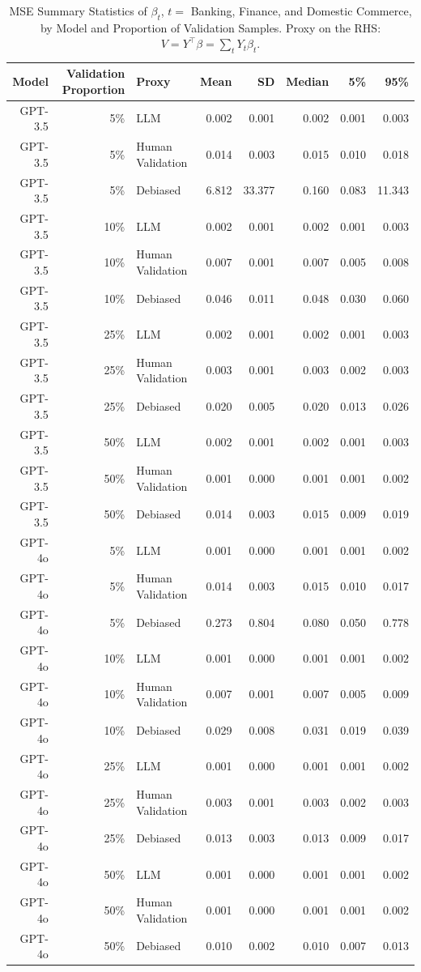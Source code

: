 \begin{table}

\caption{\label{tab:unnamed-chunk-1}MSE Summary Statistics of $\beta_{t}$, $t=$ Banking, Finance, and Domestic Commerce, by Model and Proportion of Validation Samples.
      Proxy on the RHS: $V = Y^\top \beta = \sum_{t} Y_t \beta_t$.}
\centering
\begin{tabular}[t]{rrlrrrrr}
\toprule
Model & Validation Proportion & Proxy & Mean & SD & Median & 5\% & 95\%\\
\midrule
GPT-3.5 & 5\% & LLM & 0.002 & 0.001 & 0.002 & 0.001 & 0.003\\
GPT-3.5 & 5\% & Human Validation & 0.014 & 0.003 & 0.015 & 0.010 & 0.018\\
GPT-3.5 & 5\% & Debiased & 6.812 & 33.377 & 0.160 & 0.083 & 11.343\\
GPT-3.5 & 10\% & LLM & 0.002 & 0.001 & 0.002 & 0.001 & 0.003\\
GPT-3.5 & 10\% & Human Validation & 0.007 & 0.001 & 0.007 & 0.005 & 0.008\\
GPT-3.5 & 10\% & Debiased & 0.046 & 0.011 & 0.048 & 0.030 & 0.060\\
GPT-3.5 & 25\% & LLM & 0.002 & 0.001 & 0.002 & 0.001 & 0.003\\
GPT-3.5 & 25\% & Human Validation & 0.003 & 0.001 & 0.003 & 0.002 & 0.003\\
GPT-3.5 & 25\% & Debiased & 0.020 & 0.005 & 0.020 & 0.013 & 0.026\\
GPT-3.5 & 50\% & LLM & 0.002 & 0.001 & 0.002 & 0.001 & 0.003\\
GPT-3.5 & 50\% & Human Validation & 0.001 & 0.000 & 0.001 & 0.001 & 0.002\\
GPT-3.5 & 50\% & Debiased & 0.014 & 0.003 & 0.015 & 0.009 & 0.019\\
GPT-4o & 5\% & LLM & 0.001 & 0.000 & 0.001 & 0.001 & 0.002\\
GPT-4o & 5\% & Human Validation & 0.014 & 0.003 & 0.015 & 0.010 & 0.017\\
GPT-4o & 5\% & Debiased & 0.273 & 0.804 & 0.080 & 0.050 & 0.778\\
GPT-4o & 10\% & LLM & 0.001 & 0.000 & 0.001 & 0.001 & 0.002\\
GPT-4o & 10\% & Human Validation & 0.007 & 0.001 & 0.007 & 0.005 & 0.009\\
GPT-4o & 10\% & Debiased & 0.029 & 0.008 & 0.031 & 0.019 & 0.039\\
GPT-4o & 25\% & LLM & 0.001 & 0.000 & 0.001 & 0.001 & 0.002\\
GPT-4o & 25\% & Human Validation & 0.003 & 0.001 & 0.003 & 0.002 & 0.003\\
GPT-4o & 25\% & Debiased & 0.013 & 0.003 & 0.013 & 0.009 & 0.017\\
GPT-4o & 50\% & LLM & 0.001 & 0.000 & 0.001 & 0.001 & 0.002\\
GPT-4o & 50\% & Human Validation & 0.001 & 0.000 & 0.001 & 0.001 & 0.002\\
GPT-4o & 50\% & Debiased & 0.010 & 0.002 & 0.010 & 0.007 & 0.013\\
\bottomrule
\end{tabular}
\end{table}
